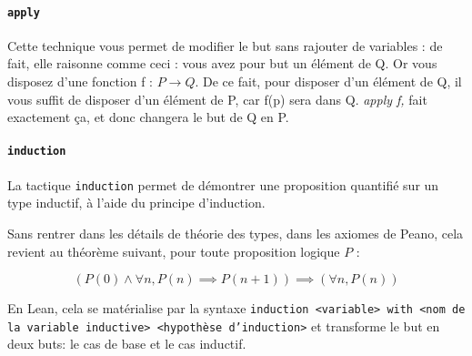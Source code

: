 \paragraph{\texttt{apply}}
Cette technique vous permet de modifier le but sans rajouter de variables : de fait, elle raisonne comme ceci : vous avez pour but un élément de Q. Or vous disposez d'une fonction f : $P \to Q$. De ce fait, pour disposer d'un élément de Q, il vous suffit de disposer d'un élément de P, car f(p) sera dans Q. \textit{apply f,} fait exactement ça, et donc changera le but de Q en P.\\

\paragraph{\texttt{induction}}

La tactique \texttt{induction} permet de démontrer une proposition quantifié sur un type inductif, à l'aide du principe d'induction.

Sans rentrer dans les détails de théorie des types, dans les axiomes de Peano, cela revient au théorème suivant, pour toute proposition logique $P$ :

\begin{equation*}
\left(P(0) \land \forall n, P(n) \implies P(n + 1)\right) \implies (\forall n, P(n))
\end{equation*}

En Lean, cela se matérialise par la syntaxe \texttt{induction <variable> with <nom de la variable inductive> <hypothèse d'induction>} et transforme le but en deux buts: le cas de base et le cas inductif.
